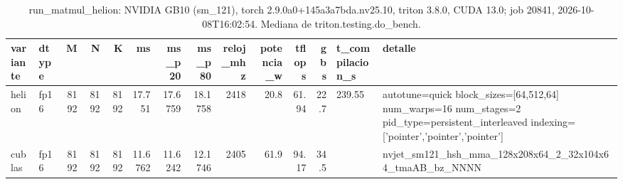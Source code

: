 \begin{table}[htbp]
  \centering\small
  \begin{tabular}{llrrrrrrrrrrll}
    \toprule
    variante & dtype & M & N & K & ms & ms\_p20 & ms\_p80 & reloj\_mhz & potencia\_w & tflops & gbs & t\_compilacion\_s & detalle \\
    \midrule
    helion & fp16 & 8192 & 8192 & 8192 & 17.751 & 17.6759 & 18.1758 & 2418 & 20.8 & 61.94 & 22.7 & 239.55 & autotune=quick block\_sizes=[64,512,64] num\_warps=16 num\_stages=2 pid\_type=persistent\_interleaved indexing=['pointer','pointer','pointer'] \\
    cublas & fp16 & 8192 & 8192 & 8192 & 11.6762 & 11.6242 & 12.1746 & 2405 & 61.9 & 94.17 & 34.5 &  & nvjet\_sm121\_hsh\_mma\_128x208x64\_2\_32x104x64\_tmaAB\_bz\_NNNN \\
    \bottomrule
  \end{tabular}
  \caption{run\_matmul\_helion: NVIDIA GB10 (sm\_121), torch 2.9.0a0+145a3a7bda.nv25.10, triton 3.8.0, CUDA 13.0; job 20841, 2026-10-08T16:02:54. Mediana de triton.testing.do\_bench.}
  \label{tab:hennessy-frio-run-matmul-helion}
\end{table}
